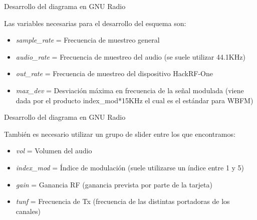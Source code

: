 \begin{frame}{Desarrollo del diagrama en GNU Radio}

Las variables necesarias para el desarrollo del esquema son:
\begin{itemize}
    \item {\textit{sample\_rate} = Frecuencia de muestreo general}
    \item {\textit{audio\_rate} = Frecuencia de muestreo del audio (se suele utilizar 44.1KHz)}
    \item {\textit{out\_rate} = Frecuencia de muestreo del dispositivo HackRF-One}
    \item {\textit{max\_dev} = Desviación máxima en frecuencia de la señal modulada (viene dada por el producto index\_mod*15KHz el cual es el estándar para WBFM)}
    
\end{itemize}{}

\end{frame}

\begin{frame}{Desarrollo del diagrama en GNU Radio}

También es necesario utilizar un grupo de slider entre los que encontramos:
\begin{itemize}
    \item {\textit{vol}  = Volumen del audio}
    \item {\textit{index\_mod} = Índice de modulación (suele utilizarse un índice entre 1 y 5)}
    \item {\textit{gain} = Ganancia RF (ganancia prevista por parte de la tarjeta)}
    \item {\textit{tunf} = Frecuencia de Tx (frecuencia de las distintas portadoras de los canales)}
    
\end{itemize}{}

\end{frame}


